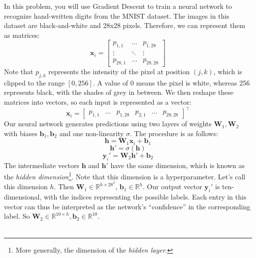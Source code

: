 \documentclass{article}
\begin{document}
In this problem, you will use Gradient Descent to train a neural network to recognize hand-written digits from the MNIST dataset. The images in this dataset are black-and-white and 28x28 pixels. Therefore, we can represent them as matrices: $$\mathbf{x}_i = \begin{bmatrix} p_{1,1} & \hdots & p_{1,28} \\ \vdots & \ddots & \vdots \\ p_{28,1} & \hdots & p_{28,28}\end{bmatrix}$$ Note that $p_{j, k}$ represents the intensity of the pixel at position $(j, k)$, which is clipped to the range $[0, 256]$. A value of 0 means the pixel is white, whereas 256 represents black, with the shades of grey in between. We then reshape these matrices into vectors, so each input is represented as a vector: $$\mathbf{x}_i = \begin{bmatrix} p_{1, 1} & \hdots & p_{1, 28} & p_{2, 1} & \hdots & p_{28, 28} \end{bmatrix}^{\top}$$ Our neural network generates predictions using two layers of weights $\mathbf{W}_1, \mathbf{W}_2$ with biases $\mathbf{b}_1, \mathbf{b}_2$ and one non-linearity $\sigma$. The procedure is as follows: $$\mathbf{h} = \mathbf{W}_1\mathbf{x}_i + \mathbf{b}_1$$ $$\mathbf{h'} = \sigma(\mathbf{h})$$ $$\mathbf{y}_i' = \mathbf{W}_2\mathbf{h'} + \mathbf{b}_2$$ The intermediate vectors $\mathbf{h}$ and $\mathbf{h'}$ have the same dimension, which is known as the \textit{hidden dimension}\footnote{More generally, the dimension of the \textit{hidden layer}.}. Note that this dimension is a hyperparameter. Let's call this dimension $h$. Then $\mathbf{W}_1 \in \mathbb{R}^{h \times 28^2}$, $\mathbf{b}_1 \in \mathbb{R}^h$. Our output vector $\mathbf{y}_i'$ is ten-dimensional, with the indices representing the possible labels. Each entry in this vector can thus be interpreted as the network's ``confidence'' in the corresponding label. So $\mathbf{W}_2 \in \mathbb{R}^{10 \times h}, \mathbf{b}_2 \in \mathbb{R}^{10}$. \\\\
\end{document}

